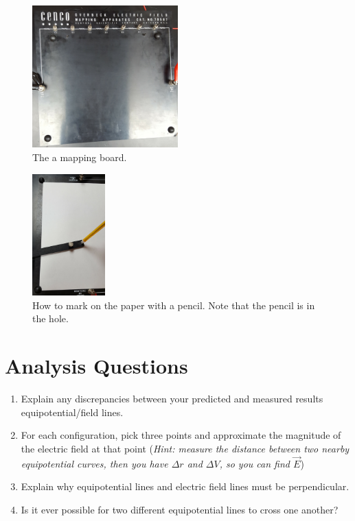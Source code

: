 \documentclass{article}
\begin{document}
	\begin{figure}[hbt!]
		\begin{center}
			\includegraphics[width=0.5\textwidth]{mapping_board}
			\caption{The a mapping board.}
			\label{fig:mapping_board}
		\end{center}
	\end{figure}
	
	\begin{figure}[htb!]
		\begin{center}
			\includegraphics[width=0.25\textwidth]{pencil}
			\caption{How to mark on the paper with a pencil. Note that the pencil is in the hole.}
			\label{fig:pencil}
		\end{center}
	\end{figure}
	
	
	
	\section*{Analysis Questions}
	\begin{enumerate}
		\item Explain any discrepancies between your predicted and measured results equipotential/field lines.
		\item For each configuration, pick three points and approximate the magnitude of the electric field at that point (\textit{Hint: measure the distance between two nearby equipotential curves, then you have $\Delta r$ and $\Delta V$, so you can find $\vec{E}$})
		\item Explain why equipotential lines and electric field lines must be perpendicular.
		\item Is it ever possible for two different equipotential lines to cross one another?
	\end{enumerate}
	
\end{document}

